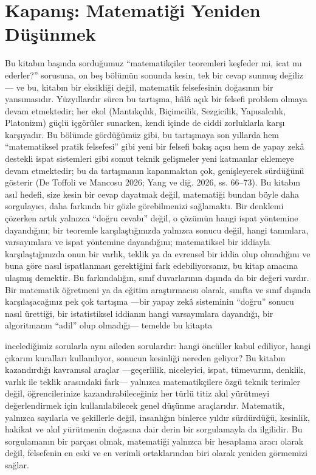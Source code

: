 \section{Kapanış: Matematiği Yeniden Düşünmek}

Bu kitabın başında sorduğumuz “matematikçiler teoremleri keşfeder mi, icat mı ederler?” sorusuna, on beş bölümün sonunda kesin, tek bir cevap sunmuş değiliz — ve bu, kitabın bir eksikliği değil, matematik felsefesinin doğasının bir yansımasıdır. Yüzyıllardır süren bu tartışma, hâlâ açık bir felsefi problem olmaya devam etmektedir; her ekol (Mantıkçılık, Biçimcilik, Sezgicilik, Yapısalcılık, Platonizm) güçlü içgörüler sunarken, kendi içinde de ciddi zorluklarla karşı karşıyadır. Bu bölümde gördüğümüz gibi, bu tartışmaya son yıllarda hem “matematiksel pratik felsefesi” gibi yeni bir felsefi bakış açısı hem de yapay zekâ destekli ispat sistemleri gibi somut teknik gelişmeler yeni katmanlar eklemeye devam etmektedir; bu da tartışmanın kapanmaktan çok, genişleyerek sürdüğünü gösterir (De Toffoli ve Mancosu 2026; Yang ve diğ. 2026, ss. 66–73). Bu kitabın asıl hedefi, size kesin bir cevap dayatmak değil, matematiği bundan böyle daha sorgulayıcı, daha farkında bir gözle görebilmenizi sağlamaktı. Bir denklemi çözerken artık yalnızca “doğru cevabı” değil, o çözümün hangi ispat yöntemine dayandığını; bir teoremle karşılaştığınızda yalnızca sonucu değil, hangi tanımlara, varsayımlara ve ispat yöntemine dayandığını; matematiksel bir iddiayla karşılaştığınızda onun bir varlık, teklik ya da evrensel bir iddia olup olmadığını ve buna göre nasıl ispatlanması gerektiğini fark edebiliyorsanız, bu kitap amacına ulaşmış demektir. Bu farkındalığın, sınıf duvarlarının dışında da bir değeri vardır. Bir matematik öğretmeni ya da eğitim araştırmacısı olarak, sınıfta ve sınıf dışında karşılaşacağınız pek çok tartışma —bir yapay zekâ sisteminin “doğru” sonucu nasıl ürettiği, bir istatistiksel iddianın hangi varsayımlara dayandığı, bir algoritmanın “adil” olup olmadığı— temelde bu kitapta

incelediğimiz sorularla aynı aileden sorulardır: hangi öncüller kabul ediliyor, hangi çıkarım kuralları kullanılıyor, sonucun kesinliği nereden geliyor? Bu kitabın kazandırdığı kavramsal araçlar —geçerlilik, niceleyici, ispat, tümevarım, denklik, varlık ile teklik arasındaki fark— yalnızca matematikçilere özgü teknik terimler değil, öğrencilerinize kazandırabileceğiniz her türlü titiz akıl yürütmeyi değerlendirmek için kullanılabilecek genel düşünme araçlarıdır. Matematik, yalnızca sayılarla ve şekillerle değil, insanlığın binlerce yıldır sürdürdüğü, kesinlik, hakikat ve akıl yürütmenin doğasına dair derin bir sorgulamayla da ilgilidir. Bu sorgulamanın bir parçası olmak, matematiği yalnızca bir hesaplama aracı olarak değil, felsefenin en eski ve en verimli ortaklarından biri olarak yeniden görmemizi sağlar.

